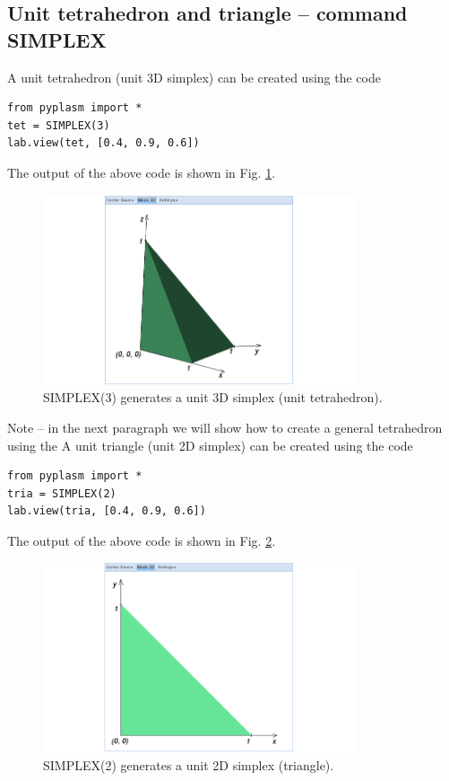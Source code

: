 \documentclass{article}
\begin{document}
\subsection{Unit tetrahedron and triangle -- command SIMPLEX}

A unit tetrahedron (unit 3D simplex) can be created using the code
\begin{verbatim}
from pyplasm import *
tet = SIMPLEX(3)
lab.view(tet, [0.4, 0.9, 0.6])
\end{verbatim}
The output of the above code is shown in Fig. \ref{fig:simplex-1}.

\begin{figure}[!ht]
\begin{center}
\includegraphics[width=0.82\textwidth]{img/simplex-1.png}
\end{center}
\vspace{-2mm}
\caption{SIMPLEX(3) generates a unit 3D simplex (unit tetrahedron).}
\label{fig:simplex-1}
\end{figure}
\noindent
Note -- in the next paragraph we will show how to create a general 
tetrahedron using the 
A unit triangle (unit 2D simplex) can be created using the code
\begin{verbatim}
from pyplasm import *
tria = SIMPLEX(2)
lab.view(tria, [0.4, 0.9, 0.6])
\end{verbatim}
The output of the above code is shown in Fig. \ref{fig:simplex-2}.
\newpage

\begin{figure}[!ht]
\begin{center}
\includegraphics[width=0.82\textwidth]{img/simplex-2.png}
\end{center}
\vspace{-2mm}
\caption{SIMPLEX(2) generates a unit 2D simplex (triangle).}
\label{fig:simplex-2}
\end{figure}
\end{document}
